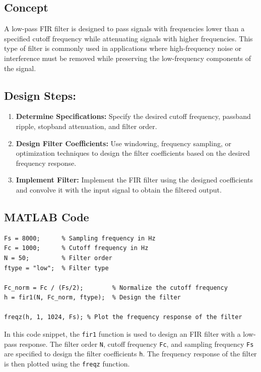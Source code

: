 \documentclass{zc-ust-hw}
\begin{document}
\subsection{Concept} A low-pass FIR filter is designed to pass signals with
frequencies lower than a specified cutoff frequency while attenuating signals
with higher frequencies. This type of filter is commonly used in applications
where high-frequency noise or interference must be removed while preserving the
low-frequency components of the signal.
  
\subsection{Design Steps:}
\begin{enumerate}
  \item \textbf{Determine Specifications:} Specify the desired cutoff
    frequency, passband ripple, stopband attenuation, and filter order.
  \item \textbf{Design Filter Coefficients:} Use windowing, frequency
    sampling, or optimization techniques to design the filter
    coefficients based on the desired frequency response.
  \item \textbf{Implement Filter:} Implement the FIR filter using the
    designed coefficients and convolve it with the input signal to
    obtain the filtered output.
\end{enumerate}

\newpage
\subsection{MATLAB Code}
\begin{verbatim}
Fs = 8000;      % Sampling frequency in Hz
Fc = 1000;      % Cutoff frequency in Hz
N = 50;         % Filter order
ftype = "low";  % Filter type

Fc_norm = Fc / (Fs/2);        % Normalize the cutoff frequency
h = fir1(N, Fc_norm, ftype);  % Design the filter

freqz(h, 1, 1024, Fs); % Plot the frequency response of the filter
\end{verbatim}
In this code snippet, the \texttt{fir1} function is used to design an
FIR filter with a low-pass response. The filter order \texttt{N}, cutoff
frequency \texttt{Fc}, and sampling frequency \texttt{Fs} are specified
to design the filter coefficients \texttt{h}. The frequency response of
the filter is then plotted using the \texttt{freqz} function.
    
\end{document}
